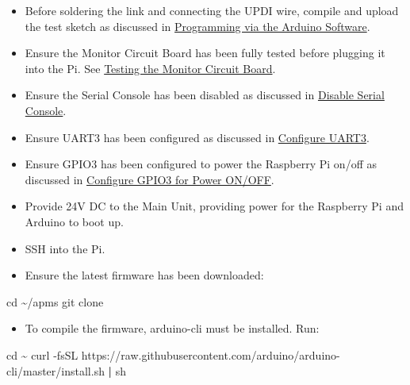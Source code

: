 \documentclass[
  letterpaper,
]{scrbook}
\newenvironment{Shaded}{\begin{snugshade}}{\end{snugshade}}
\newcommand{\AttributeTok}[1]{\textcolor[rgb]{0.40,0.45,0.13}{#1}}
\newcommand{\BuiltInTok}[1]{\textcolor[rgb]{0.00,0.23,0.31}{#1}}
\newcommand{\ExtensionTok}[1]{\textcolor[rgb]{0.00,0.23,0.31}{#1}}
\newcommand{\FunctionTok}[1]{\textcolor[rgb]{0.28,0.35,0.67}{#1}}
\newcommand{\KeywordTok}[1]{\textcolor[rgb]{0.00,0.23,0.31}{\textbf{#1}}}
\newcommand{\NormalTok}[1]{\textcolor[rgb]{0.00,0.23,0.31}{#1}}
\providecommand{\tightlist}{%
  \setlength{\itemsep}{0pt}\setlength{\parskip}{0pt}}
\begin{document}
\begin{itemize}
\item
  Before soldering the link and connecting the UPDI wire, compile and
  upload the test sketch as discussed in
  \hyperref[Programmingux5cux2520viaux5cux2520theux5cux2520Arduinoux5cux2520Software]{Programming
  via the Arduino Software}.
\item
  Ensure the Monitor Circuit Board has been fully tested before plugging
  it into the Pi. See
  \hyperref[Testingux5cux2520theux5cux2520Monitorux5cux2520Circuitux5cux2520Board]{Testing
  the Monitor Circuit Board}.
\item
  Ensure the Serial Console has been disabled as discussed in
  \hyperref[Disableux5cux2520Serialux5cux2520Console]{Disable Serial
  Console}.
\item
  Ensure UART3 has been configured as discussed in
  \hyperref[Configureux5cux2520UART3]{Configure UART3}.
\item
  Ensure GPIO3 has been configured to power the Raspberry Pi on/off as
  discussed in
  \hyperref[Configureux5cux2520GPIO3ux5cux2520forux5cux2520Powerux5cux2520ONux2fOFF]{Configure
  GPIO3 for Power ON/OFF}.
\item
  Provide 24V DC to the Main Unit, providing power for the Raspberry Pi
  and Arduino to boot up.
\item
  SSH into the Pi.
\item
  Ensure the latest firmware has been downloaded:
\end{itemize}

\begin{Shaded}
\begin{Highlighting}[]
\BuiltInTok{cd}\NormalTok{ \textasciitilde{}/apms}
\FunctionTok{git}\NormalTok{ clone}
\end{Highlighting}
\end{Shaded}

\begin{itemize}
\tightlist
\item
  To compile the firmware, arduino-cli must be installed. Run:
\end{itemize}

\begin{Shaded}
\begin{Highlighting}[]
\BuiltInTok{cd}\NormalTok{ \textasciitilde{}}
\ExtensionTok{curl} \AttributeTok{{-}fsSL}\NormalTok{ https://raw.githubusercontent.com/arduino/arduino{-}cli/master/install.sh }\KeywordTok{|} \FunctionTok{sh}
\end{Highlighting}
\end{Shaded}
\end{document}
